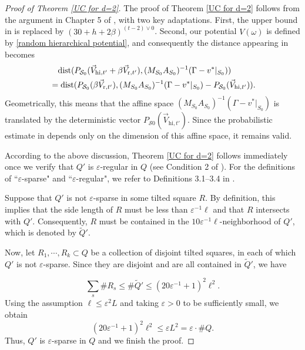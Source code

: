 \documentclass[11pt,reqno,UTF8,twoside]{amsart}
\newcommand{\mcS}{\mathcal{S}}
\newcommand{\dist}{{\rm dist}}
\theoremstyle{definition}
\numberwithin{equation}{section}
\begin{document}
\begin{proof}[Proof of Theorem \ref{UC for d=2}]
The proof of Theorem \ref{UC for d=2}  follows from the argument in Chapter 5 of \cite{Li22}, with two key adaptations. First, the upper bound in \cite[(5.13)]{Li22} is replaced by $(30 + h + 2\beta)^{(t-2)\vee 0}$. Second, our potential $V(\omega)$ is defined by \eqref{random hierarchical potential}, and consequently the distance appearing in \cite[(5.76)]{Li22} becomes
\begin{align*}
&\ \ \ \dist(P_{\mcS_0}(\vec{V}_{\text{hi},t'}+\beta \vec{V}_{\text{r},t'}),(M_{S_0}A_{S_0})^{-1} (\Gamma-v^*|_{S_0}))\\
&=\dist(P_{\mcS_0}(\beta \vec{V}_{\text{r},t'}),(M_{S_0}A_{S_0})^{-1} (\Gamma-v^*|_{S_0})-P_{\mcS_0}(\vec{V}_{\text{hi},t'})). 
\end{align*}
Geometrically, this means that the affine space $(M_{S_0}A_{S_0})^{-1} (\Gamma-v^*|_{S_0})$ is translated by the deterministic vector $P_{\mathcal{S}0}(\vec{V}_{\text{hi},t'})$. Since the probabilistic estimate in \cite[Lemma 1.6]{Li22} depends only on the dimension of this affine space, it remains valid.

According to the above discussion, Theorem \ref{UC for d=2} follows immediately once we verify that $Q'$ is $\varepsilon$-regular in $Q$ (see Condition 2 of \cite[Lemma 3.5]{Li22}). For the definitions  of  ``$\varepsilon$-sparse" and ``$\varepsilon$-regular", we refer to Definitions 3.1–3.4 in \cite{DS20}. 

Suppose that $Q'$ is not $\varepsilon$-sparse in some tilted square $R$. By definition, this implies that the side length of $R$ must be less than $\varepsilon^{-1}\ell$ and that $R$ intersects with  $Q'$. Consequently, $R$ must be contained in the $10\varepsilon^{-1}\ell$-neighborhood of $Q'$, which is denoted  by $\widetilde{Q}'$.

Now, let $R_1, \cdots, R_k \subset Q$ be a collection of disjoint tilted squares,  in each of which $Q'$ is not $\varepsilon$-sparse. Since they are disjoint and are all  contained in $\widetilde{Q}'$, we have

\[\sum_{s}\# R_s \leq \# \widetilde{Q}' \leq (20 \varepsilon^{-1} +1)^2 \ell^2 .\]
Using the assumption  $\ell \leq \varepsilon^2 L$ and taking $\varepsilon > 0$ to be sufficiently small, we obtain
\[(20 \varepsilon^{-1} +1)^2 \ell^2 \leq \varepsilon L^2 =\varepsilon\cdot  \# Q.\]
Thus, $Q'$ is $\varepsilon$-sparse in $Q$ and we finish the proof.
\end{proof}
\end{document}
